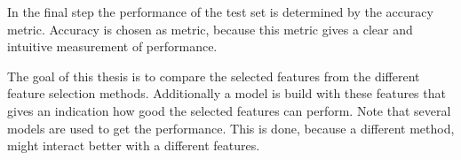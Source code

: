 \npar

In the final step the performance of the test set is determined by the accuracy metric. Accuracy is chosen as metric, because this metric gives a clear and intuitive measurement of performance.

\npar

The goal of this thesis is to compare the selected features from the different feature selection methods. Additionally a model is build with these features that gives an indication how good the selected features can perform. Note that several models are used to get the performance. This is done, because a different method, might interact better with a different features.

